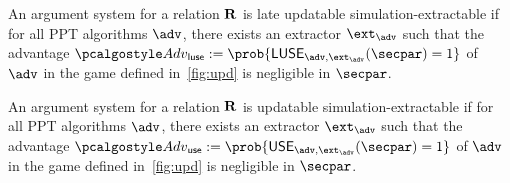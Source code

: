 \begin{definition}\label{late-use}
	An argument system for a relation $\mathbf{R}$ is late updatable simulation-extractable if for all PPT algorithms $\advse$, there exists an extractor $\ext_{\advse}$ such that the advantage $\Adv_{\luse}:=\prob{ \LUSE_{\advse,\ext_{\advse}}(\secpar) = 1}$ of $\advse$ in the game defined in~\cref{fig:upd} is negligible in $\secpar$.
\end{definition}

\begin{definition}\label{USE}
	An argument system for a relation $\mathbf{R}$ is updatable simulation-extractable if for all PPT algorithms $\advse$, there exists an extractor $\ext_{\advse}$ such that the advantage $\Adv_{\use} := \prob{ \USE_{\advse,\ext_{\advse}}(\secpar) = 1}$ of $\advse$ in the game defined in~\cref{fig:upd} is negligible in $\secpar$.
\end{definition}

